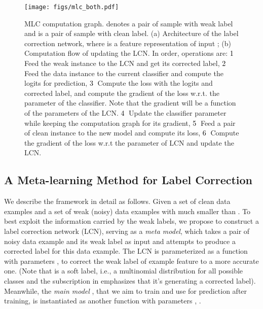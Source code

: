 \begin{figure}[t]
  \centering
  \texttt{[image: figs/mlc\_both.pdf]}
    \caption{ MLC computation graph.  denotes a
      pair of sample with weak label and  is a
      pair of sample with clean label. (a) Architecture of the label
      correction network, where  is a feature
      representation of input ; (b) Computation flow of
      updating the LCN. In order, operations are:
      \textcolor{black}{\textcircled{1}} Feed the weak instance to the
      LCN and get its corrected label,
      \textcolor{black}{\textcircled{2}} Feed the data instance to the
      current classifier and compute the logits for prediction,
      \textcolor{black}{\textcircled{3}} Compute the loss with the
      logits and corrected label, and compute the gradient of the loss
      w.r.t. the parameter of the classifier. Note that the
      gradient will be a function of the parameters of the LCN.
      \textcolor{black}{\textcircled{4}} Update the classifier
      parameter while keeping the computation graph for its gradient,
      \textcolor{black}{\textcircled{5}} Feed a pair of clean instance
      to the new model and compute its loss,
      \textcolor{black}{\textcircled{6}} Compute the gradient of the
      loss w.r.t the parameter of LCN and update the LCN.}
    \label{fig:model}
\end{figure}





\subsection{A Meta-learning Method for Label Correction}
We describe the framework in detail as follows. Given a set of clean
data examples  and a set of weak (noisy) data
examples  with  much smaller than
. To best exploit the information carried by the weak labels, we
propose to construct a label correction network (LCN), serving as a
\textit{meta model}, which takes a pair of noisy data example and its
weak label as input and attempts to produce a corrected label for this
data example. The LCN is parameterized as a function with parameters
,  to correct the
weak label  of example feature  to a more accurate one. (Note
that  is a soft label, i.e., a multinomial distribution for all possible classes and the subscription in  emphasizes that it's generating a
corrected label). Meanwhile, the \textit{main model} , that we aim
to train and use for prediction after training, is instantiated as
another function with parameters , .

